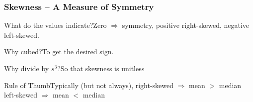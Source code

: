 \begin{frame}

\frametitle{Skewness -- A Measure of Symmetry}

\begin{center}
\end{center}
\pause
\begin{block}{What do the values indicate?}Zero $\Rightarrow$ symmetry, positive right-skewed, negative left-skewed.\end{block} \pause
\begin{block}{Why cubed?}To get the desired sign.\end{block} \pause
\begin{block}{Why divide by $s^3$?}So that skewness is unitless\end{block}\pause
\begin{block}{Rule of Thumb}Typically (but not always), right-skewed $\Rightarrow$ mean $>$ median\\ left-skewed $\Rightarrow$ mean $<$ median\end{block}

\end{frame}

